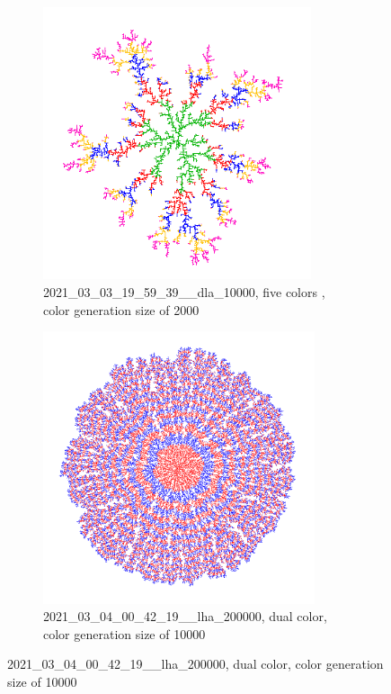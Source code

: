 \documentclass[12pt,a4paper]{scrartcl}
\newcommand{\1}{\mathbbm{1}}
\theoremstyle{definition}
\numberwithin{equation}{section}
\begin{document}
\begin{figure}[h!]
	\centering
	\begin{subfigure}[b]{.49\textwidth}
		\includegraphics[height=8cm]{images/ia/2021_03_03_19_59_39___10000__2000__7448.png}
		\caption{2021\_03\_03\_19\_59\_39\_\_dla\_10000, five colors , color generation size of 2000}
	\end{subfigure}
	\begin{subfigure}[b]{.49\textwidth}
		\includegraphics[height=8cm]{images/ia/2021_03_04_00_42_19___200000__10000__6945.png}
		\caption{2021\_03\_04\_00\_42\_19\_\_lha\_200000, dual color, color generation size of 10000}
	\end{subfigure}
\end{figure}
\end{document}
